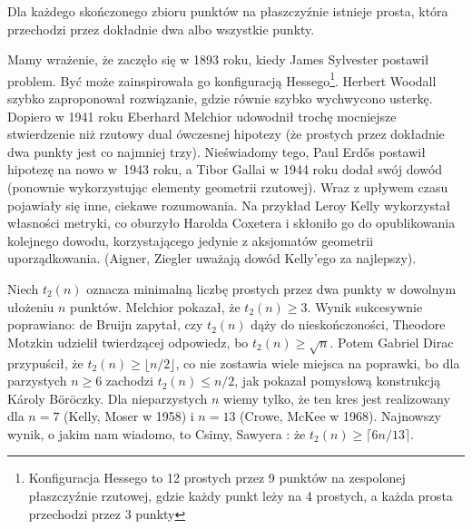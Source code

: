 \begin{theorem}
	Dla każdego skończonego zbioru punktów na płaszczyźnie istnieje prosta, która przechodzi przez dokładnie dwa albo wszystkie punkty.
\end{theorem}

Mamy wrażenie, że zaczęło się w 1893 roku, kiedy James Sylvester postawił problem.
%
Być może zainspirowała go konfiguracją Hessego\footnote{Konfiguracja Hessego to 12 prostych przez 9 punktów na zespolonej płaszczyźnie rzutowej, gdzie każdy punkt leży na 4 prostych, a każda prosta przechodzi przez 3 punkty}.
%
Herbert Woodall szybko zaproponował rozwiązanie, gdzie równie szybko wychwycono usterkę.
%
Dopiero w 1941 roku Eberhard Melchior udowodnił trochę mocniejsze stwierdzenie niż rzutowy dual ówczesnej hipotezy (że prostych przez dokładnie dwa punkty jest co najmniej trzy).
%
Nieświadomy tego, Paul Erdős postawił hipotezę na nowo w~1943 roku, a Tibor Gallai w 1944 roku dodał swój dowód (ponownie wykorzystując elementy geometrii rzutowej).
%
%
Wraz z upływem czasu pojawiały się inne, ciekawe rozumowania.
Na przykład Leroy Kelly wykorzystał własności metryki, co oburzyło Harolda Coxetera i skłoniło go do opublikowania kolejnego dowodu, korzystającego jedynie z aksjomatów geometrii uporządkowania.
%
%
(Aigner, Ziegler uważają dowód Kelly'ego za najlepszy).

Niech $t_2(n)$ oznacza minimalną liczbę prostych przez dwa punkty w dowolnym ułożeniu $n$ punktów.
Melchior pokazał, że $t_2(n) \ge 3$.
Wynik sukcesywnie poprawiano:
de Bruijn \cite{debruijn_1948} zapytał, czy $t_2(n)$ dąży do nieskończoności,
%
Theodore Motzkin \cite{motzkin_1951} udzielił twierdzącej odpowiedz, bo $t_2(n) \ge \sqrt{n}$.
%
Potem Gabriel Dirac \cite{dirac_1951} przypuścił, że $t_2(n) \ge \lfloor n/2\rfloor$, co nie zostawia wiele miejsca na poprawki, bo dla parzystych $n \ge 6$ zachodzi $t_2(n) \le n/2$, jak pokazał pomysłową konstrukcją Károly Böröczky.
%
%
Dla nieparzystych $n$ wiemy tylko, że ten kres jest realizowany dla $n = 7$ (Kelly, Moser \cite{kelly_1958} w 1958) i $n = 13$ (Crowe, McKee \cite{mckee_1968} w 1968).
%
%
%
Najnowszy wynik, o jakim nam wiadomo, to Csimy, Sawyera \cite{csima_1993}: że $t_2(n) \ge \lceil 6n/13 \rceil$.
%
%
